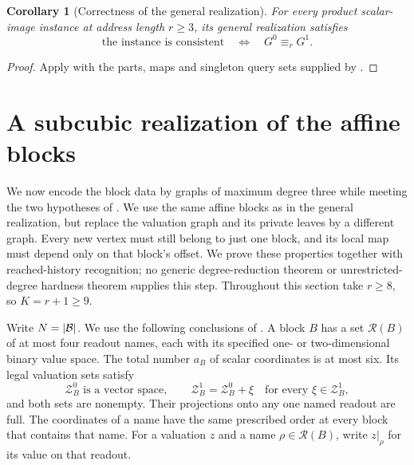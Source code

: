 \documentclass[11pt]{article}
\newtheorem{corollary}[theorem]{Corollary}
\theoremstyle{definition}
\newcommand{\cB}{\mathcal B}
\newcommand{\cR}{\mathcal R}
\newcommand{\cZ}{\mathcal Z}
\DeclarePairedDelimiter{\abs}{\lvert}{\rvert}
\begin{document}
\begin{corollary}[Correctness of the general realization]
\label{cor:general-game}
For every product scalar-image instance at address length \(r\ge3\),
its general realization satisfies
\[
 \text{the instance is consistent}\quad\Longleftrightarrow\quad
 G^0\equiv_r G^1.
\]
\end{corollary}
\begin{proof}
Apply  with the parts, maps and singleton
query sets supplied by .
\end{proof}

\section{A subcubic realization of the affine blocks}
\label{graph:section}

We now encode the block data by graphs of maximum degree three while
meeting the two hypotheses of .
We use the same affine blocks as in the general realization, but replace
the valuation graph and its private leaves by a different graph. Every
new vertex must still belong to just one block, and its local map must
depend only on that block's offset. We prove these properties together
with reached-history recognition; no generic degree-reduction theorem
or unrestricted-degree hardness theorem supplies this step.
Throughout this section take \(r\ge8\), so \(K=r+1\ge9\).

Write \(N=\abs{\cB}\).  We use the following conclusions of
.  A block \(B\) has a set \(\cR(B)\) of at most four
readout names, each with its specified one- or two-dimensional binary
value space.  The total number \(a_B\) of scalar coordinates is at most
six.  Its legal valuation sets satisfy
\[
  \cZ_B^0\text{ is a vector space},\qquad
  \cZ_B^1=\cZ_B^0+\xi
       \quad\text{for every }\xi\in\cZ_B^1,
\]
and both sets are nonempty.  Their projections onto any one named
readout are full.  The coordinates of a name have the same prescribed
order at every block that contains that name.  For a valuation \(z\)
and a name \(\rho\in\cR(B)\), write \(z|_\rho\) for its value on that
readout.
\end{document}
